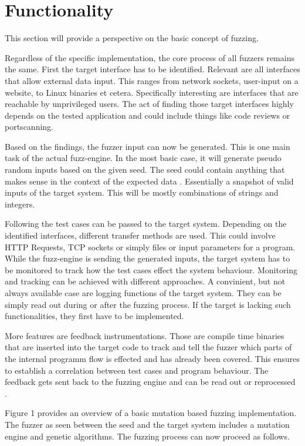 \documentclass[journal=tosc,final]{iacrtrans}
\begin{document}
\section{Functionality}
This section will provide a perspective on the basic concept of fuzzing.

Regardless of the specific implementation, the core process of all fuzzers remains the same. First the target interface has to be identified. Relevant are all interfaces that allow external data input. This ranges from network sockets, user-input on a website, to Linux binaries et cetera. Specifically interesting are interfaces that are reachable by unprivileged users. The act of finding those target interfaces highly depends on the tested application and could include things like code reviews or portscanning. 


Based on the findings, the fuzzer input can now be generated. This is one main task of the actual fuzz-engine. In the most basic case, it will generate pseudo random inputs based on the given seed. The seed could contain anything that makes sense in the context of the expected data \cite{li2018fuzzing}. Essentially a snapshot of valid inputs of the target system. This will be mostly combinations of strings and integers. 

Following the test cases can be passed to the  target system. Depending on the identified interfaces, different transfer methods are used. This could involve HTTP Requests, TCP sockets or simply files or input parameters for a program. While the fuzz-engine is sending the generated inputs, the target system has to be monitored to track how the test cases effect the system behaviour. Monitoring and tracking can be achieved with different approaches. A convinient, but not always available case are logging functions of the target system. They can be simply read out during or after the fuzzing process. If the target is lacking such functionalities, they first have to be implemented. 

More features are feedback instrumentations. Those are compile time binaries that are inserted into the target code to track and tell the fuzzer which parts of the internal programm flow is effected and has already been covered. This ensures to establish a correlation between test cases and program behaviour. The feedback gets sent back to the fuzzing engine and can be read out or reprocessed \cite{algo}.


Figure 1 provides an overview of a basic mutation based fuzzing implementation. The fuzzer as seen between the seed and the target system includes a mutation engine and genetic algorithms. The fuzzing process can now proceed as follows.
\end{document}
